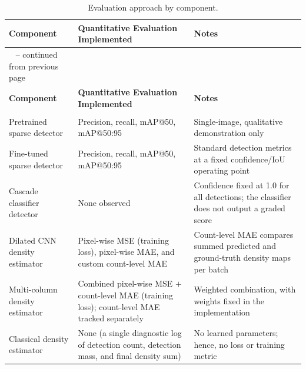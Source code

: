 \begin{longtable}{|
		>{\raggedright\arraybackslash}p{}|
		>{\raggedright\arraybackslash}p{}|
		>{\raggedright\arraybackslash}p{}|}
	
	\caption{Evaluation approach by component.}
	\label{tab:metrics}\\
	
	\hline
	\textbf{Component} &
	\textbf{Quantitative Evaluation Implemented} &
	\textbf{Notes} \\
	\hline
	\endfirsthead
	
	\multicolumn{3}{c}%
	{{\tablename\ \thetable{} -- continued from previous page}} \\
	\hline
	\textbf{Component} &
	\textbf{Quantitative Evaluation Implemented} &
	\textbf{Notes} \\
	\hline
	\endhead
	
	\hline
	\multicolumn{3}{r}{{Continued on next page}} \\
	\endfoot
	
	\hline
	\endlastfoot
	
	Pretrained sparse detector
	&
	Precision, recall, mAP@50, mAP@50:95
	&
	Single-image, qualitative demonstration only
	\\
	\hline
	
	Fine-tuned sparse detector
	&
	Precision, recall, mAP@50, mAP@50:95
	&
	Standard detection metrics at a fixed confidence/IoU operating point
	\\
	\hline
	
	Cascade classifier detector
	&
	None observed
	&
	Confidence fixed at 1.0 for all detections; the classifier does not output a graded score
	\\
	\hline
	
	Dilated CNN density estimator
	&
	Pixel-wise MSE (training loss), pixel-wise MAE, and custom count-level MAE
	&
	Count-level MAE compares summed predicted and ground-truth density maps per batch
	\\
	\hline
	
	Multi-column density estimator
	&
	Combined pixel-wise MSE $+$ count-level MAE (training loss); count-level MAE tracked separately
	&
	Weighted combination, with weights fixed in the implementation
	\\
	\hline
	
	Classical density estimator
	&
	None (a single diagnostic log of detection count, detection mass, and final density sum)
	&
	No learned parameters; hence, no loss or training metric
	\\
	\hline
	
	
\end{longtable}

